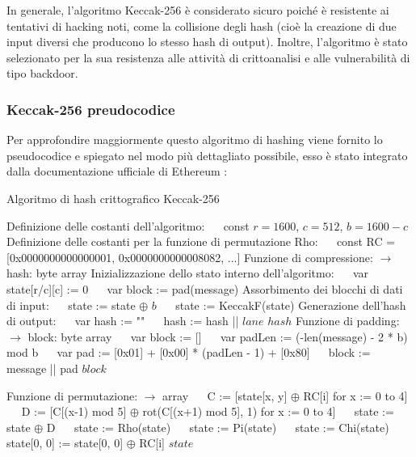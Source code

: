 \documentclass[a4paper,11pt]{report}
\begin{document}
In generale, l'algoritmo Keccak-256 è considerato sicuro poiché è resistente ai tentativi di hacking noti, come la collisione degli hash (cioè la creazione di due input diversi che producono lo stesso hash di output). Inoltre, l'algoritmo è stato selezionato per la sua resistenza alle attività di crittoanalisi e alle vulnerabilità di tipo backdoor.

\subsubsection{Keccak-256 preudocodice}
Per approfondire maggiormente questo algoritmo di hashing viene fornito lo pseudocodice e spiegato nel modo più dettagliato possibile, esso è stato integrato dalla documentazione ufficiale di Ethereum \cite{ETH}:
\begin{algorithm}
\caption{Algoritmo di hash crittografico Keccak-256}
\begin{algorithmic}[1]
\State Definizione delle costanti dell'algoritmo:
\State $\quad$ const $r = 1600$, $c = 512$, $b = 1600 - c$
\State Definizione delle costanti per la funzione di permutazione Rho:
\State $\quad$ const RC = [0x0000000000000001, 0x0000000000008082, ...]
\State Funzione di compressione:
 $\rightarrow$ {hash: byte array}
\State Inizializzazione dello stato interno dell'algoritmo:
\State $\quad$ var state[r/c][c] := 0
\State $\quad$ var block := pad(message)
\State Assorbimento dei blocchi di dati di input:
\State $\quad$ state := state $\oplus$ $b$
\State $\quad$ state := KeccakF(state)
\EndFor
\State Generazione dell'hash di output:
\State $\quad$ var hash := ""
\State $\quad$ hash := hash || $lane$
\EndFor
\EndFor
\State \Return $hash$
\EndFunction
\State Funzione di padding:
 $\rightarrow$ {block: byte array}
\State $\quad$ var block := []
\State $\quad$ var padLen := (-len(message) - 2 * b) mod b
\State $\quad$ var pad := [0x01] + [0x00] * (padLen - 1) + [0x80]
\State $\quad$ block := message || pad
\State \Return $block$
\EndFunction

\State Funzione di permutazione:
 $\rightarrow$ {array}
\State $\quad$ C := [state[x, y] $\oplus$ RC[i] for x := 0 to 4]
\State $\quad$ D := [C[(x-1) mod 5] $\oplus$ rot(C[(x+1) mod 5], 1) for x := 0 to 4]
\State $\quad$ state := state $\oplus$ D
\State $\quad$ state := Rho(state)
\State $\quad$ state := Pi(state)
\State $\quad$ state := Chi(state)
\State $\quad$ state[0, 0] := state[0, 0] $\oplus$ RC[i]
\EndFor
\State \Return $state$
\EndFunction
\end{algorithmic}
\end{algorithm}
\end{document}
